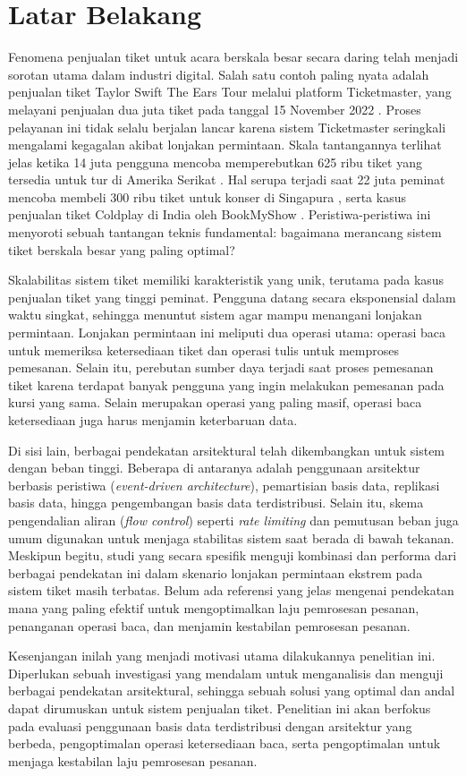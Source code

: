 \section{Latar Belakang}
\label{sec:latar-belakang}

Fenomena penjualan tiket untuk acara berskala besar secara daring telah menjadi sorotan utama dalam industri digital. Salah satu contoh paling nyata adalah penjualan tiket Taylor Swift The Ears Tour melalui platform Ticketmaster, yang melayani penjualan dua juta tiket pada tanggal 15 November 2022 \parencite{swiftTicketmaster}. Proses pelayanan ini tidak selalu berjalan lancar karena sistem Ticketmaster seringkali mengalami kegagalan akibat lonjakan permintaan. Skala tantangannya terlihat jelas ketika 14 juta pengguna mencoba memperebutkan 625 ribu tiket yang tersedia untuk tur di Amerika Serikat \parencite{USTaylorSwift}. Hal serupa terjadi saat 22 juta peminat mencoba membeli 300 ribu tiket untuk konser di Singapura \parencite{asiaTaylorSwift}, serta kasus penjualan tiket Coldplay di India oleh BookMyShow \parencite{coldplayBookMyShow}. Peristiwa-peristiwa ini menyoroti sebuah tantangan teknis fundamental: bagaimana merancang sistem tiket berskala besar yang paling optimal?

Skalabilitas sistem tiket memiliki karakteristik yang unik, terutama pada kasus penjualan tiket yang tinggi peminat. Pengguna datang secara eksponensial dalam waktu singkat, sehingga menuntut sistem agar mampu menangani lonjakan permintaan. Lonjakan permintaan ini meliputi dua operasi utama: operasi baca untuk memeriksa ketersediaan tiket dan operasi tulis untuk memproses pemesanan. Selain itu, perebutan sumber daya terjadi saat proses pemesanan tiket karena terdapat banyak pengguna yang ingin melakukan pemesanan pada kursi yang sama. Selain merupakan operasi yang paling masif, operasi baca ketersediaan juga harus menjamin keterbaruan data.

Di sisi lain, berbagai pendekatan arsitektural telah dikembangkan untuk sistem dengan beban tinggi. Beberapa di antaranya adalah penggunaan arsitektur berbasis peristiwa (\textit{event-driven architecture}), pemartisian basis data, replikasi basis data, hingga pengembangan basis data terdistribusi. Selain itu, skema pengendalian aliran (\textit{flow control}) seperti \textit{rate limiting} dan pemutusan beban juga umum digunakan untuk menjaga stabilitas sistem saat berada di bawah tekanan. Meskipun begitu, studi yang secara spesifik menguji kombinasi dan performa dari berbagai pendekatan ini dalam skenario lonjakan permintaan ekstrem pada sistem tiket masih terbatas. Belum ada referensi yang jelas mengenai pendekatan mana yang paling efektif untuk mengoptimalkan laju pemrosesan pesanan, penanganan operasi baca, dan menjamin kestabilan pemrosesan pesanan.

Kesenjangan inilah yang menjadi motivasi utama dilakukannya penelitian ini. Diperlukan sebuah investigasi yang mendalam untuk menganalisis dan menguji berbagai pendekatan arsitektural, sehingga sebuah solusi yang optimal dan andal dapat dirumuskan untuk sistem penjualan tiket. Penelitian ini akan berfokus pada evaluasi penggunaan basis data terdistribusi dengan arsitektur yang berbeda, pengoptimalan operasi ketersediaan baca, serta pengoptimalan untuk menjaga kestabilan laju pemrosesan pesanan.
